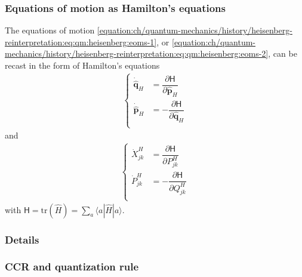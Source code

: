 \documentclass[letterpaper,10pt,english]{jupyterBook}
\begin{document}
\subsubsection{Equations of motion as Hamilton’s equations}
\label{\detokenize{ch/quantum-mechanics/history/heisenberg-reinterpretation:equations-of-motion-as-hamilton-s-equations}}\label{\detokenize{ch/quantum-mechanics/history/heisenberg-reinterpretation:quantum-mechanics-history-heisenberg-reinterpretation-hamilton-eqns}}
\sphinxAtStartPar
The equations of motion \eqref{equation:ch/quantum-mechanics/history/heisenberg-reinterpretation:eq:qm:heisenberg:eoms-1}, or \eqref{equation:ch/quantum-mechanics/history/heisenberg-reinterpretation:eq:qm:heisenberg:eoms-2}, can be recast in the form of Hamilton’s equations
\begin{equation*}
\begin{split}
\left\{
\begin{aligned}
  \dot{\hat{\mathbf{q}}}_H & = \dfrac{\partial \mathsf{H}}{\partial \hat{\mathbf{p}}_H} \\
  \dot{\hat{\mathbf{p}}}_H & =-\dfrac{\partial \mathsf{H}}{\partial \hat{\mathbf{q}}_H} \\
\end{aligned}
\right.
\end{split}
\end{equation*}
\sphinxAtStartPar
and
\begin{equation*}
\begin{split}
\left\{
\begin{aligned}
  \dot{X}^{H}_{jk} & = \dfrac{\partial \mathsf{H}}{\partial P^{H}_{jk}} \\
  \dot{P}^{H}_{jk} & =-\dfrac{\partial \mathsf{H}}{\partial Q^{H}_{jk}} \\
\end{aligned}
\right.
\end{split}
\end{equation*}
\sphinxAtStartPar
with \(\mathsf{H} = \text{tr} \left( \hat{H} \right) = \sum_a \langle a | \hat{H} | a \rangle \).
\subsubsection*{Details}


\subsubsection{CCR and quantization rule}
\label{\detokenize{ch/quantum-mechanics/history/heisenberg-reinterpretation:ccr-and-quantization-rule}}\label{\detokenize{ch/quantum-mechanics/history/heisenberg-reinterpretation:quantum-mechanics-history-heisenberg-reinterpretation-ccr-quantization-rule}}
\end{document}
